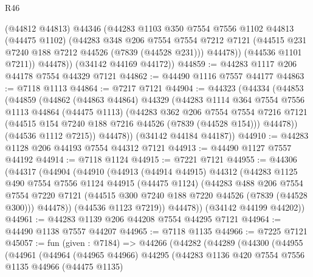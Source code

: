 \begin{lexlean}{R46}
\begin{coremodule}
            (@44812 @44813)
            @44346
            (@44283
              @1103
              @350
              @7554
              @7556
              @1102
              @44813
              (@44475 @1102)
              (@44283
                @348
                @206
                @7554
                @7554
                @7212
                @7121
                (@44515 @231 @7240 @188 @7212 @44526 (@7839 (@44528 @231)))
                @44478))
            (@44536 @1101 @7211))
          @44478))
      (@34142 @44169 @44172))
@44859 := @44283 @1117 @206 @44178 @7554 @44329 @7121
@44862 := @44490 @1116 @7557 @44177
@44863 := @7118 @1113
@44864 := @7217 @7121
@44904 := @44323
    (@44334
      (@44853
        (@44859
          (@44862
            (@44863 @44864)
            @44329
            (@44283
              @1114
              @364
              @7554
              @7556
              @1113
              @44864
              (@44475 @1113)
              (@44283
                @362
                @206
                @7554
                @7554
                @7216
                @7121
                (@44515 @154 @7240 @188 @7216 @44526 (@7839 (@44528 @154)))
                @44478))
            (@44536 @1112 @7215))
          @44478))
      (@34142 @44184 @44187))
@44910 := @44283 @1128 @206 @44193 @7554 @44312 @7121
@44913 := @44490 @1127 @7557 @44192
@44914 := @7118 @1124
@44915 := @7221 @7121
@44955 := @44306
    (@44317
      (@44904
        (@44910
          (@44913
            (@44914 @44915)
            @44312
            (@44283
              @1125
              @490
              @7554
              @7556
              @1124
              @44915
              (@44475 @1124)
              (@44283
                @488
                @206
                @7554
                @7554
                @7220
                @7121
                (@44515 @300 @7240 @188 @7220 @44526 (@7839 (@44528 @300)))
                @44478))
            (@44536 @1123 @7219))
          @44478))
      (@34142 @44199 @44202))
@44961 := @44283 @1139 @206 @44208 @7554 @44295 @7121
@44964 := @44490 @1138 @7557 @44207
@44965 := @7118 @1135
@44966 := @7225 @7121
@45057 := fun (given : @7184) =>
  @44266
    (@44282
      (@44289
        (@44300
          (@44955
            (@44961
              (@44964
                (@44965 @44966)
                @44295
                (@44283
                  @1136
                  @420
                  @7554
                  @7556
                  @1135
                  @44966
                  (@44475 @1135)

\end{coremodule}
\end{lexlean}
